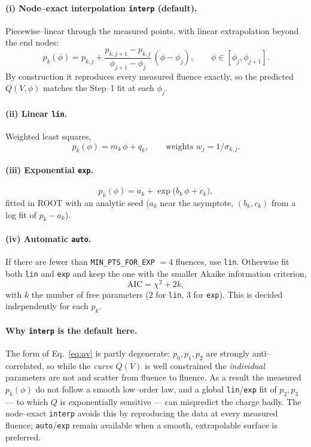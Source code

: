\documentclass[11pt]{article}
\newcommand{\code}[1]{\texttt{#1}}
\begin{document}
\paragraph{(i) Node--exact interpolation \code{interp} (default).}
Piecewise--linear through the measured points, with linear extrapolation beyond
the end nodes:
\begin{equation}
  p_k(\phi) = p_{k,j} + \frac{p_{k,j+1}-p_{k,j}}{\phi_{j+1}-\phi_j}\,(\phi-\phi_j),
  \qquad \phi\in[\phi_j,\phi_{j+1}].
\end{equation}
By construction it reproduces every measured fluence exactly, so the predicted
$Q(V,\phi)$ matches the Step--1 fit at each $\phi_j$.

\paragraph{(ii) Linear \code{lin}.} Weighted least squares,
\begin{equation}
  p_k(\phi) = m_k\,\phi + q_k, \qquad
  \text{weights } w_j = 1/\sigma_{k,j}.
\end{equation}

\paragraph{(iii) Exponential \code{exp}.}
\begin{equation}
  p_k(\phi) = a_k + \exp\!\big(b_k\,\phi + c_k\big),
\end{equation}
fitted in ROOT with an analytic seed ($a_k$ near the asymptote, $(b_k,c_k)$ from a
log fit of $p_k-a_k$).

\paragraph{(iv) Automatic \code{auto}.} If there are fewer than
\code{MIN\_PTS\_FOR\_EXP} $=4$ fluences, use \code{lin}. Otherwise fit both
\code{lin} and \code{exp} and keep the one with the smaller Akaike information
criterion,
\begin{equation}
  \mathrm{AIC} = \chi^2 + 2k,
\end{equation}
with $k$ the number of free parameters ($2$ for \code{lin}, $3$ for \code{exp}).
This is decided independently for each $p_k$.

\paragraph{Why \code{interp} is the default here.} The form of
Eq.~\ref{eq:qv} is partly degenerate: $p_0,p_1,p_2$ are strongly
anti--correlated, so while the \emph{curve} $Q(V)$ is well constrained the
\emph{individual} parameters are not and scatter from fluence to fluence. As a
result the measured $p_k(\phi)$ do not follow a smooth low--order law, and a global
\code{lin}/\code{exp} fit of $p_2,p_3$ --- to which $Q$ is exponentially
sensitive --- can mispredict the charge badly. The node--exact \code{interp}
avoids this by reproducing the data at every measured fluence; \code{auto}/\code{exp}
remain available when a smooth, extrapolable surface is preferred.
\end{document}
